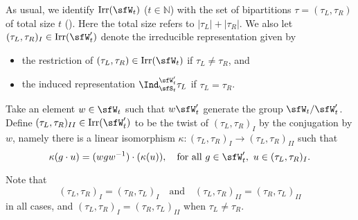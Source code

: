\documentclass[12pt,a4paper]{amsart}
\def\abs#1{\left|{#1}\right|}
\newcommand{\BN}{{\mathbb {N}}}
\numberwithin{equation}{section}
\theoremstyle{remark}
\def\Irr{\mathrm{Irr}}
\begin{document}
 As usual, we identify $\Irr(\sfW_{t})$ ($t\in \BN$) with the set of bipartitions $\tau =(\tau_{L},\tau_{R})$ of total size $t$ (\cite[Section 11.4]{Carter}). Here the total size refers to
$\abs{\tau_{L}}+\abs{\tau_{R}}$.
We also let $(\tau_{L},\tau_{R})_{I}\in \Irr(\sfW'_t)$ denote the  irreducible representation  given by
  \begin{itemize}
    \item the restriction of $(\tau_{L},\tau_{R})\in \Irr(\sfW_{t})$  if
    $\tau_{L}\neq \tau_{R}$, and
    \item
    the induced representation
    $\Ind_{\sfS_{t}}^{\sfW'_{t}} \tau_{L}$ if $\tau_{L}=\tau_{R}$.
  \end{itemize}
  Take an element $w\in \sfW_t$ such that $w \sfW_t'$ generate the group $\sfW_t/\sfW'_t$. Define   $(\tau_{L},\tau_{R})_{II}\in \Irr(\sfW'_t)$ to be the twist of $(\tau_{L},\tau_{R})_{I}$ by the conjugation by $w$, namely there is a linear isomorphism $\kappa: (\tau_{L},\tau_{R})_{I}\rightarrow (\tau_{L},\tau_{R})_{II}$ such that
  \[
    \kappa(g\cdot u)= (wgw^{-1})\cdot (\kappa(u)), \quad \textrm{for all }g\in \sfW'_t, \ u\in (\tau_{L},\tau_{R})_{I}.
  \]


  Note that
  \[
     (\tau_{L},\tau_{R})_{I}=(\tau_{R},\tau_{L})_{I}\quad \textrm{and}\quad (\tau_{L},\tau_{R})_{II}=(\tau_{R},\tau_{L})_{II}
  \]
in all cases, and  $(\tau_{L},\tau_{R})_{I}=(\tau_{R},\tau_{L})_{II}$ when     $\tau_{L}\neq \tau_{R}$.
\end{document}
